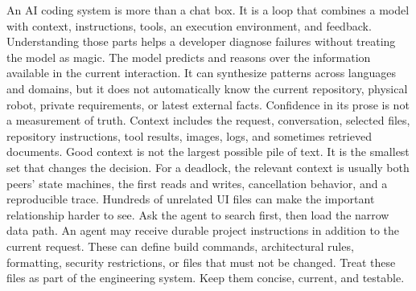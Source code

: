 \markdownRendererInterblockSeparator
{}An AI coding system is more than a chat box. It is a loop that combines a model\markdownRendererSoftLineBreak
{}with context, instructions, tools, an execution environment, and feedback.\markdownRendererSoftLineBreak
{}Understanding those parts helps a developer diagnose failures without treating\markdownRendererSoftLineBreak
{}the model as magic.\markdownRendererInterblockSeparator
{}\markdownRendererSectionBegin
{}\markdownRendererInterblockSeparator
{}The model predicts and reasons over the information available in the current\markdownRendererSoftLineBreak
{}interaction. It can synthesize patterns across languages and domains, but it\markdownRendererSoftLineBreak
{}does not automatically know the current repository, physical robot, private\markdownRendererSoftLineBreak
{}requirements, or latest external facts. Confidence in its prose is not a\markdownRendererSoftLineBreak
{}measurement of truth.\markdownRendererInterblockSeparator
{}
\markdownRendererSectionEnd \markdownRendererSectionBegin
{}\markdownRendererInterblockSeparator
{}Context includes the request, conversation, selected files, repository\markdownRendererSoftLineBreak
{}instructions, tool results, images, logs, and sometimes retrieved documents.\markdownRendererSoftLineBreak
{}Good context is not the largest possible pile of text. It is the smallest set\markdownRendererSoftLineBreak
{}that changes the decision.\markdownRendererParagraphSeparator
{}For a deadlock, the relevant context is usually both peers' state machines,\markdownRendererSoftLineBreak
{}the first reads and writes, cancellation behavior, and a reproducible trace.\markdownRendererSoftLineBreak
{}Hundreds of unrelated UI files can make the important relationship harder to\markdownRendererSoftLineBreak
{}see. Ask the agent to search first, then load the narrow data path.\markdownRendererInterblockSeparator
{}
\markdownRendererSectionEnd \markdownRendererSectionBegin
{}\markdownRendererInterblockSeparator
{}An agent may receive durable project instructions in addition to the current\markdownRendererSoftLineBreak
{}request. These can define build commands, architectural rules, formatting,\markdownRendererSoftLineBreak
{}security restrictions, or files that must not be changed. Treat these files as\markdownRendererSoftLineBreak
{}part of the engineering system. Keep them concise, current, and testable.\markdownRendererParagraphSeparator
